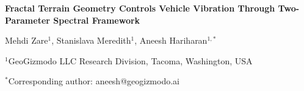 \documentclass[11pt]{article}
\begin{document}
\begin{center}
{\Large\bfseries Fractal Terrain Geometry Controls Vehicle Vibration Through Two-Parameter Spectral Framework}

\vspace{1cm}

Mehdi Zare$^{1}$, Stanislava Meredith$^{1}$, Aneesh Hariharan$^{1,*}$

\vspace{0.5cm}

$^{1}$GeoGizmodo LLC Research Division, Tacoma, Washington, USA

\vspace{0.5cm}

$^{*}$Corresponding author: aneesh@geogizmodo.ai

\end{center}

\newpage
\end{document}
